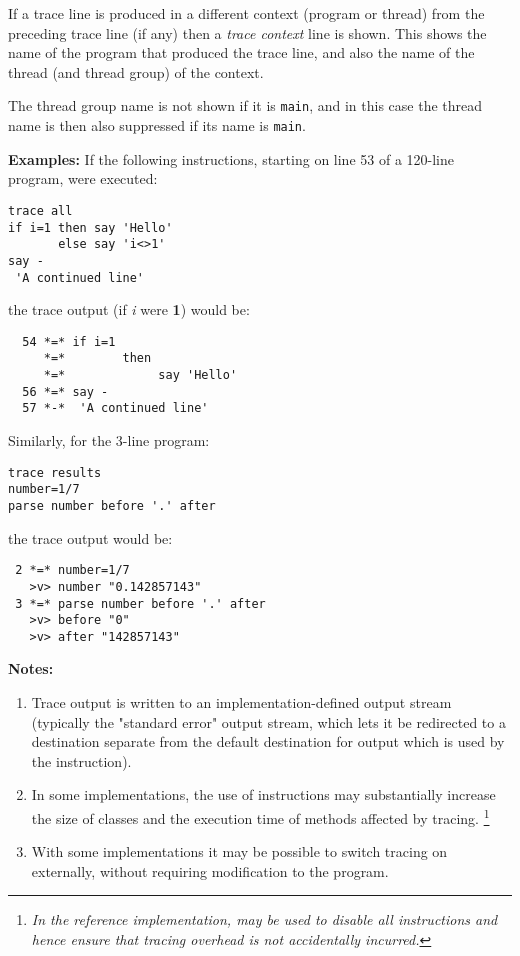If a trace line is produced in a different context (program or thread)
from the preceding trace line (if any) then a \emph{trace context}
line is shown.  This shows the name of the program that produced the
trace line, and also the name of the thread (and thread group) of the
context.
 
The thread group name is not shown if it is \texttt{main}, and in this
case the thread name is then also suppressed if its name is \texttt{main}.
 
\textbf{Examples:}
 If the following instructions, starting on line 53 of a 120-line
program, were executed:
\begin{lstlisting}
trace all
if i=1 then say 'Hello'
       else say 'i<>1'
say -
 'A continued line'
\end{lstlisting}
the trace output (if \emph{i} were \textbf{1}) would be:
\begin{lstlisting}
  54 *=* if i=1
     *=*        then
     *=*             say 'Hello'
  56 *=* say -
  57 *-*  'A continued line'
\end{lstlisting}
 Similarly, for the 3-line program:
\begin{lstlisting}
trace results
number=1/7
parse number before '.' after
\end{lstlisting}
the trace output would be:
\begin{lstlisting}
 2 *=* number=1/7
   >v> number "0.142857143"
 3 *=* parse number before '.' after
   >v> before "0"
   >v> after "142857143"
\end{lstlisting}
 \textbf{Notes:}
\begin{enumerate}
\item 
Trace output is written to an implementation-defined output stream
(typically the "standard error" output stream, which lets it be
redirected to a destination separate from the default destination for
output which is used by the  instruction).
\item In some implementations, the use of  instructions
may substantially increase the size of classes and the execution time of
methods affected by tracing.
\footnote{
\emph{In the reference implementation,  may be
used to disable all  instructions and hence ensure that
tracing overhead is not accidentally incurred.}
}
\item With some implementations it may be possible to switch tracing on
externally, without requiring modification to the program.
\end{enumerate}

